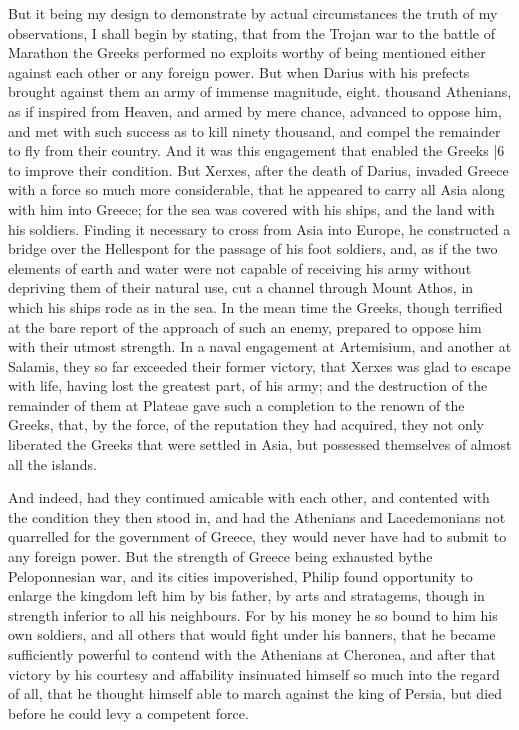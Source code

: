 But it being my design to demonstrate by actual circumstances the truth of my observations,
I shall begin by stating, that from the Trojan war to the battle of Marathon the Greeks performed no exploits worthy of being mentioned either against each other or any foreign power. But when Darius with his prefects brought against them an army of immense magnitude, eight. thousand Athenians, as if inspired from Heaven, and armed by mere chance, advanced to oppose him, and met with such success as to kill ninety thousand, and compel the remainder to fly from their country. And it was this engagement that enabled the Greeks
|6 to improve their condition. But Xerxes, after the death of Darius, invaded Greece with a force so much more considerable, that he appeared to carry all Asia along with him into Greece; for the sea was covered with his ships, and the land with his soldiers. Finding it necessary to cross from Asia into Europe, he constructed a bridge over the Hellespont for the passage of his foot soldiers, and, as if the two elements of earth and water were not capable of receiving his army without depriving them of their natural use, cut a channel through Mount Athos, in which his ships rode as in the sea. In the mean time the Greeks, though terrified at the bare report of the approach of such an enemy, prepared to oppose him with their utmost strength. In a naval engagement at Artemisium, and another at Salamis, they so far exceeded their former victory, that Xerxes was glad to escape with life, having lost the greatest part, of his army; and the destruction of the remainder of them at Plateae gave such a completion to the renown of the Greeks, that, by the force, of the reputation they had acquired, they not only liberated the Greeks that were settled in Asia, but possessed themselves of almost all the islands.

And indeed, had they continued amicable with each other, and contented with the condition they then stood in, and had the Athenians and Lacedemonians not quarrelled for the government of Greece, they would never have had to submit to any foreign power. But the strength of Greece being exhausted by\emph{}the Peloponnesian war, and its cities impoverished, Philip found opportunity to enlarge the kingdom left him by bis father, by arts and stratagems, though in strength inferior to all his neighbours. For by his money he so bound to him his own soldiers, and all others that would fight under his banners, that he became sufficiently powerful to contend with the Athenians at Cheronea, and after that victory by his courtesy and affability insinuated himself so much into the regard of all, that he thought himself able to march against the king of Persia, but died before he could levy a competent force.

